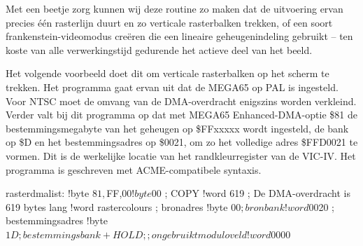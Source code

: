 Met een beetje zorg kunnen wij deze routine zo maken dat de uitvoering ervan precies één rasterlijn duurt en zo verticale rasterbalken trekken, of een soort frankenstein-videomodus creëren die een lineaire geheugenindeling gebruikt -- ten koste van alle verwerkingstijd gedurende het actieve deel van het beeld.

Het volgende voorbeeld doet dit om verticale rasterbalken op het scherm te trekken. Het programma gaat ervan uit dat de MEGA65 op PAL is ingesteld. Voor NTSC moet de omvang van de DMA-overdracht enigszins worden verkleind. Verder valt bij dit programma op dat met MEGA65 Enhanced-DMA-optie \$81 de bestemmingsmegabyte van het geheugen op \$FFxxxxx wordt ingesteld, de bank op \$D en het bestemmingsadres op \$0021, om zo het volledige adres \$FFD0021 te vormen. Dit is de werkelijke locatie van het randkleurregister van de VIC-IV. Het programma is geschreven met ACME-compatibele syntaxis.


\begin{asmcodesmall}
rasterdmalist:
  !byte $81,$FF,$00
  !byte $00     ; COPY
  !word 619     ; De DMA-overdracht is 619 bytes lang
  !word rastercolours  ; bronadres
  !byte $00     ; bronbank
  !word $0020   ; bestemmingsadres
  !byte $1D     ; bestemmingsbank + HOLD
  ;; ongebruikt moduloveld
  !word $0000
\end{asmcodesmall}

